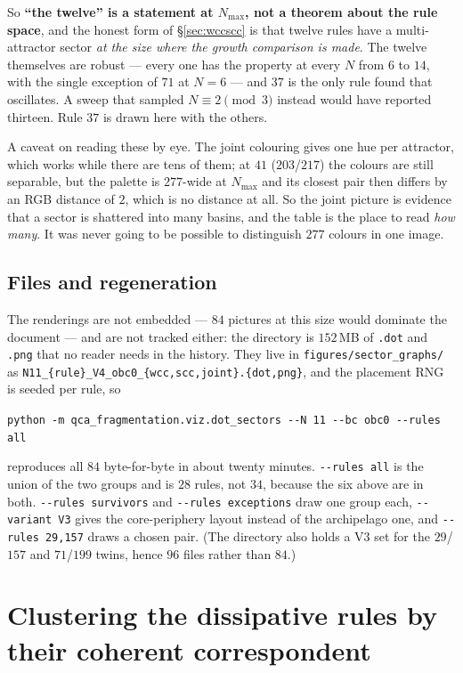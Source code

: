 \documentclass[11pt]{article}
\newcommand{\fn}[1]{\texttt{#1}}
\theoremstyle{plain}
\theoremstyle{definition}
\begin{document}
So \textbf{``the twelve'' is a statement at $N_{\max}$, not a theorem about the
rule space}, and the honest form of \S\ref{sec:wccscc} is that twelve rules have
a multi-attractor sector \emph{at the size where the growth comparison is made}.
The twelve themselves are robust --- every one has the property at every $N$ from
$6$ to $14$, with the single exception of $71$ at $N=6$ --- and $37$ is the only
rule found that oscillates. A sweep that sampled $N\equiv2\pmod 3$ instead would
have reported thirteen. Rule $37$ is drawn here with the others.

\noindent A caveat on reading these by eye. The joint colouring gives one hue per
attractor, which works while there are tens of them; at $41$ ($203$/$217$) the
colours are still separable, but the palette is $277$-wide at $N_{\max}$ and its
closest pair then differs by an RGB distance of $2$, which is no distance at all.
So the joint picture is evidence that a sector is shattered into many basins, and
the table is the place to read \emph{how many}. It was never going to be possible
to distinguish $277$ colours in one image.

\subsection{Files and regeneration}

The renderings are not embedded --- $84$ pictures at this size would dominate the
document --- and are not tracked either: the directory is $152$\,MB of \fn{.dot}
and \fn{.png} that no reader needs in the history. They live in
\fn{figures/sector\_graphs/} as
\fn{N11\_\{rule\}\_V4\_obc0\_\{wcc,scc,joint\}.\{dot,png\}}, and the placement
RNG is seeded per rule, so
\begin{center}
\fn{python -m qca\_fragmentation.viz.dot\_sectors -{}-N 11 -{}-bc obc0 -{}-rules all}
\end{center}
reproduces all $84$ byte-for-byte in about twenty minutes. \fn{-{}-rules all} is
the union of the two groups and is $28$ rules, not $34$, because the six above
are in both. \fn{-{}-rules survivors} and \fn{-{}-rules exceptions} draw one
group each, \fn{-{}-variant V3} gives the core-periphery layout instead of the
archipelago one, and \fn{-{}-rules 29,157} draws a chosen pair. (The directory
also holds a V3 set for the $29$/$157$ and $71$/$199$ twins, hence $96$ files
rather than $84$.)

\section{Clustering the dissipative rules by their coherent correspondent}
\label{sec:coherent}
\end{document}
